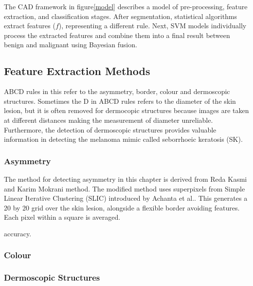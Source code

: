 The CAD framework in figure\ref{model} describes a model of pre-processing, feature extraction, and classification stages. After segmentation, statistical algorithms extract features ($f$), representing a different rule. Next, SVM models individually process the extracted features and combine them into a final result between benign and malignant using Bayesian fusion.



\subsection{Feature Extraction Methods}
ABCD rules in this refer to the asymmetry, border, colour and dermoscopic structures.  Sometimes the D in ABCD rules refers to the diameter of the skin lesion, but it is often removed for dermocopic structures because images are taken at different distances making the measurement of diameter unreliable. Furthermore, the detection of dermoscopic structures provides valuable information in detecting the melanoma mimic called seborrhoeic keratosis (SK)\cite{Minagawa2017}. 

\subsubsection{Asymmetry}
The method for detecting asymmetry in this chapter is derived from Reda Kasmi and Karim Mokrani\cite{Kasmi2016} method. The modified method uses superpixels from Simple Linear Iterative Clustering (SLIC) introduced by Achanta et al.\cite{Achanta2012}. This generates a 20 by 20 grid over the skin lesion, alongside a flexible border avoiding features. Each pixel within a square is averaged.

accuracy.

\subsubsection{Colour}


\subsubsection{Dermoscopic Structures}

